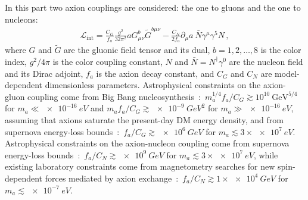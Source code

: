 In this part two axion couplings are considered: the one to gluons and the one to nucleons:
\begin{align}
\label{Axion_couplings}
\mathcal{L}_{\textrm{int}} = \frac{C_G}{f_a} \frac{g^2}{32\pi^2} a G^{b}_{\mu \nu} \tilde{G}^{b \mu \nu}  - \frac{C_N}{2f_a} \partial_\mu a ~ \bar{N} \gamma^\mu \gamma^5 N \, ,
\end{align}
where $G$ and $\tilde{G}$ are the gluonic field tensor and its dual, $b=1,2,\ldots,8$ is the  color index, $g^2 / 4 \pi$ is the color coupling constant, {\color{black}$N$ and $\bar{N} = N^\dagger \gamma^0$ are the nucleon field and its Dirac adjoint,} $f_a$ is the axion decay constant, and $C_G$ and {\color{black}$C_N$} are model-dependent dimensionless parameters.
Astrophysical constraints on the axion-gluon coupling come from Big Bang nucleosynthesis~\cite{Blum2014,StadnikThesis,Stadnik2015D}:~$m_a^{1/4} f_a / C_G \gtrsim 10^{10}~\textrm{GeV}^{5/4}$ for $m_a \ll \SI{e-16}{eV}$ and $m_a f_a / C_G \gtrsim \SI{e-9}{GeV^2}$ for $m_a \gg \SI{e-16}{eV}$, assuming that axions saturate the present-day DM energy density,
and from supernova energy-loss bounds~\cite{Graham2013,Raffelt1990Review}:~$f_a / C_G \gtrsim \SI{e6}{GeV}$ for $m_a \lesssim 3 \times \SI{e7}{eV}$.
{\color{black}Astrophysical constraints on the axion-nucleon coupling come from supernova energy-loss bounds~\cite{Raffelt1990Review,Raffelt2008LNP}:~$f_a / C_N \gtrsim \SI{e9}{GeV}$ for $m_a \lesssim 3 \times \SI{e7}{eV}$, while existing laboratory constraints come from magnetometry searches for new spin-dependent forces mediated by axion exchange~\cite{Romalis2009_NF}:~$f_a / C_N \gtrsim 1 \times \SI{e4}{GeV}$ for $m_a \lesssim \SI{e-7}{eV}$. }

